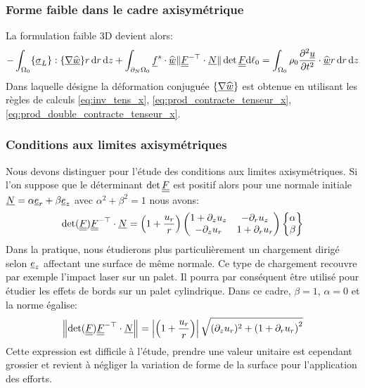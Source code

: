 \documentclass[10pt]{book}
\newcommand{\dlo}{\d\ell_{0}}
\begin{document}
\begin{Rem}{}\end{Rem}
\subsubsection{Forme faible dans le cadre axisymétrique}
La formulation faible 3D devient alors:
$$-\int_{\Configuration_{0}}\{\vec{\sigma}_{L}\}:\{\vec{\nabla}\DepVirt\}r\dr\dz+\int_{\dNOm_{0}}\FSurf\cdot\DepVirt\Vert\GT^{-\top}\cdot\NormaleInit\Vert\det\GT\dlo=\int_{\Configuration_{0}}\rho_{0}\dfrac{\partial^{2}\Dep}{\partial t^{2}}\cdot\DepVirt r\dr\dz$$
Dans laquelle désigne la déformation conjuguée $\{\underline{\nabla}\widehat{\underline{w}}\}$ est obtenue en utilisant les règles de calculs \eqref{eq:inv_tens_x}, \eqref{eq:prod_contracte_tenseur_x}, \eqref{eq:prod_double_contracte_tenseur_x}.
\subsubsection{Conditions aux limites axisymétriques}
Nous devons distinguer pour l'étude des conditions aux limites axisymétriques. Si l'on suppose que le déterminant $\det\underline{\underline{F}}$ est positif alors pour une normale initiale $\underline{N}=\alpha\underline{e}_{r}+\beta\underline{e}_{z}$ avec $\alpha^{2}+\beta^{2}=1$ nous avons: 
$$\det(\underline{\underline{F}})\underline{\underline{F}}^{-\top}\cdot\underline{N}=\left(1+\frac{u_{r}}{r}\right)\begin{pmatrix}
1+\partial_{z}u_{z} & -\partial_{r}u_{z}\\
 -\partial_{z}u_{r}& 1+\partial_{r}u_{r}
\end{pmatrix}\begin{Bmatrix}
\alpha\\
\beta\end{Bmatrix}$$
Dans la pratique, nous étudierons plus particulièrement un chargement dirigé selon $\underline{e}_{z}$ affectant une surface de même normale. Ce type de chargement recouvre par exemple l'impact laser sur un palet. Il pourra par conséquent être utilisé pour étudier les effets de bords sur un palet cylindrique. Dans ce cadre, $\beta=1$, $\alpha=0$ et la norme égalise:
$$\left\Vert\det(\underline{\underline{F}})\underline{\underline{F}}^{-\top}\cdot\underline{N}\right\Vert=\left|\left(1+\frac{u_{r}}{r}\right)\right|\sqrt{(\partial_{z}u_{r})^{2}+\left(1+\partial_{r}u_{r}\right)^{2}}$$
Cette expression est difficile à l'étude, prendre une valeur unitaire est cependant grossier et revient à négliger la variation de forme de la surface pour l'application des efforts.
\end{document}
